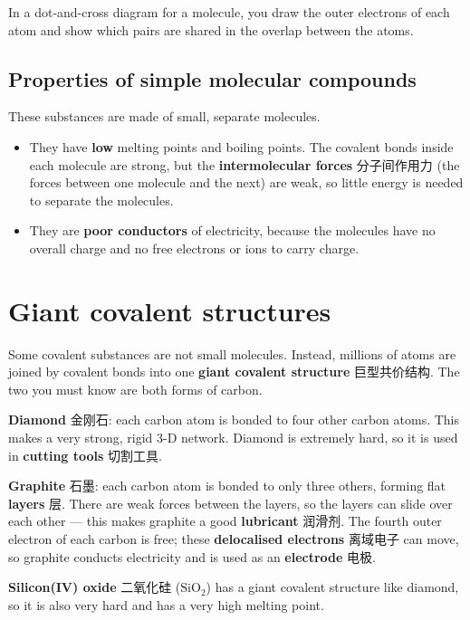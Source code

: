 \documentclass[11pt]{article}
\begin{document}
In a dot-and-cross diagram for a molecule, you draw the outer electrons of each atom and show which pairs are shared in the overlap between the atoms.

\subsection*{Properties of simple molecular compounds}

These substances are made of small, separate molecules.

\begin{itemize}
\item They have \textbf{low} melting points and boiling points. The covalent bonds inside each molecule are strong, but the \textbf{intermolecular forces} 分子间作用力 (the forces between one molecule and the next) are weak, so little energy is needed to separate the molecules.

\item They are \textbf{poor conductors} of electricity, because the molecules have no overall charge and no free electrons or ions to carry charge.

\end{itemize}

\section*{Giant covalent structures}

Some covalent substances are not small molecules. Instead, millions of atoms are joined by covalent bonds into one \textbf{giant covalent structure} 巨型共价结构. The two you must know are both forms of carbon.

\textbf{Diamond} 金刚石: each carbon atom is bonded to four other carbon atoms. This makes a very strong, rigid 3-D network. Diamond is extremely hard, so it is used in \textbf{cutting tools} 切割工具.

\textbf{Graphite} 石墨: each carbon atom is bonded to only three others, forming flat \textbf{layers} 层. There are weak forces between the layers, so the layers can slide over each other — this makes graphite a good \textbf{lubricant} 润滑剂. The fourth outer electron of each carbon is free; these \textbf{delocalised electrons} 离域电子 can move, so graphite conducts electricity and is used as an \textbf{electrode} 电极.

\textbf{Silicon(IV) oxide} 二氧化硅 ($\text{SiO}_2$) has a giant covalent structure like diamond, so it is also very hard and has a very high melting point.
\end{document}
